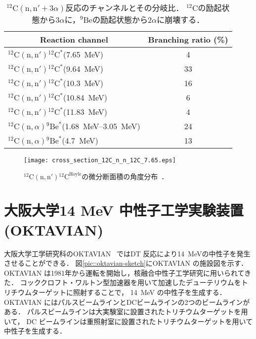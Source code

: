 \documentclass[../master]{subfiles}
\begin{document}
\begin{table}
  \centering
  \caption[${}^{12}\mathrm{C}(\mathrm{n},\mathrm{n}'+3\alpha)$反応のチャンネルとその分岐比．]
          {${}^{12}\mathrm{C}(\mathrm{n},\mathrm{n}'+3\alpha)$反応のチャンネルとその分岐比．
  ${}^{12}\mathrm{C}$の励起状態から$3\alpha$に，${}^{9}\mathrm{Be}$の励起状態から$2\alpha$に崩壊する．}
  \label{tab::branchingratio}
  \begin{tabular}{lc}
    \toprule
    \multicolumn{1}{c}{Reaction channel} & Branching ratio (\%)\\
    \midrule
    ${}^{12}\mathrm{C}(\mathrm{n},\mathrm{n}'){}^{12}\mathrm{C}^{*}$(\SI{7.65}{\mega\electronvolt}) & 4\\
    ${}^{12}\mathrm{C}(\mathrm{n},\mathrm{n}'){}^{12}\mathrm{C}^{*}$(\SI{9.64}{\mega\electronvolt}) & 33\\
    ${}^{12}\mathrm{C}(\mathrm{n},\mathrm{n}'){}^{12}\mathrm{C}^{*}$(\SI{10.3}{\mega\electronvolt}) & 16\\
    ${}^{12}\mathrm{C}(\mathrm{n},\mathrm{n}'){}^{12}\mathrm{C}^{*}$(\SI{10.84}{\mega\electronvolt}) & 6\\
    ${}^{12}\mathrm{C}(\mathrm{n},\mathrm{n}'){}^{12}\mathrm{C}^{*}$(\SI{11.83}{\mega\electronvolt}) & 4\\
    ${}^{12}\mathrm{C}(\mathrm{n},\alpha){}^{9}\mathrm{Be}^{*}$(\SIrange{1.68}{3.05}{\mega\electronvolt}) & 24\\
    ${}^{12}\mathrm{C}(\mathrm{n},\alpha){}^{9}\mathrm{Be}^{*}$(\SI{4.7}{\mega\electronvolt}) & 13\\
    \bottomrule
  \end{tabular}
\end{table}

\begin{figure}
  \centering
  \texttt{[image: cross\_section\_12C\_n\_n\_12C\_7.65.eps]}
  \caption[${}^{12}\mathrm{C}(\mathrm{n},\mathrm{n}'){}^{12}\mathrm{C}^{\text{Hoyle}}$の微分断面積の角度分布．]
          {${}^{12}\mathrm{C}(\mathrm{n},\mathrm{n}'){}^{12}\mathrm{C}^{\text{Hoyle}}$の微分断面積の角度分布~\cite{kondoetal}．}
  \label{fig::sig_angle_dist}
\end{figure}

\section{大阪大学14 MeV 中性子工学実験装置 (OKTAVIAN)}
大阪大学工学研究科のOKTAVIAN~\cite{oktavian} ではDT 反応により\SI{14}{\mega\electronvolt}の中性子を発生させることができる．
図\ref{pic::oktavian-sketch}にOKTAVIAN の施設図を示す．
OKTAVIAN は1981年から運転を開始し，核融合中性子工学研究に用いられてきた．
コッククロフト・ワルトン型加速器を用いて加速したデューテリウムをトリチウムターゲットに照射することで，
\SI{14}{\mega\electronvolt} の中性子を生成する．
OKTAVIAN にはパルスビームラインとDCビームラインの2つのビームラインがある．
パルスビームラインは大実験室に設置されたトリチウムターゲットを用いて，
DC ビームラインは重照射室に設置されたトリチウムターゲットを用いて中性子を生成する．
\end{document}
